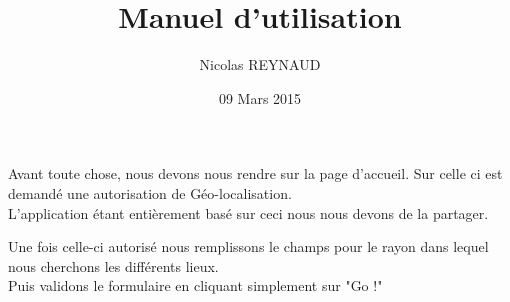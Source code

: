 \documentclass[10pt,a4paper, landscape]{report}
\author{Nicolas REYNAUD}
\title{Manuel d'utilisation}
\date{\vfill 09 Mars 2015}
\begin{document}
\maketitle
\newpage


\renewcommand{\contentsname}{Sommaire}
\tableofcontents
\newpage

\center
\section{}

Avant toute chose, nous devons nous rendre sur la page d'accueil. Sur celle ci est demandé une autorisation de Géo-localisation.\\
L'application étant entièrement basé sur ceci nous nous devons de la partager.\\
{%
\setlength{\fboxsep}{0pt}%
\setlength{\fboxrule}{2pt}%
%

\newpage
Une fois celle-ci autorisé nous remplissons le champs pour le rayon dans lequel nous cherchons les différents lieux. \\
Puis validons le formulaire en cliquant simplement sur "Go !" \\
{%
\setlength{\fboxsep}{0pt}%
\setlength{\fboxrule}{2pt}%
%

}}
\end{document}
